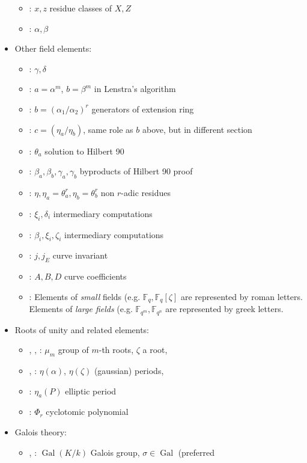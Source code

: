 \documentclass[12pt]{article}
\theoremstyle{plain}
\theoremstyle{definition}
\DeclareMathOperator{\gal}{Gal} %
\def\F{\ensuremath{\mathbb{F}}}
\newcounter{algorithm}
\begin{document}
\begin{itemize}
\begin{itemize}
  \item \kummer: $x,z$ residue classes of $X,Z$
  \item \rains: $\alpha,\beta$
  \end{itemize}
\item Other field elements:
  \begin{itemize}
  \item \poster: $\gamma, \delta$
  \item \poster: $a=\alpha^m$, $b=\beta^m$ in Lenstra's algorithm
  \item \kummer: $b=(\alpha_1/\alpha_2)^r$ generators of extension ring
  \item \kummer: $c=(\eta_a/\eta_b)$, same role as $b$ above, but in different section
  \item \kummer: $\theta_a$ solution to Hilbert 90
  \item \kummer: $\beta_a,\beta_b,\gamma_a,\gamma_b$ byproducts of Hilbert 90 proof
  \item \kummer: $\eta,\eta_a=\theta_a^r,\eta_b=\theta_b^r$ non $r$-adic residues
  \item \kummer: $\xi_i,\delta_i$ intermediary computations
  \item \kummer: $\beta_i,\xi_i,\zeta_i$ intermediary computations
  \item \rains: $j,j_E$ curve invariant
  \item \rains: $A,B,D$ curve coefficients
  \item \prop: Elements of \emph{small} fields (e.g. $\F_q,
    \F_q[\zeta]$ are represented by roman letters. Elements of
    \emph{large fields} (e.g. $\F_{q^m},\F_{q^n}$ are represented by
    greek letters.
  \end{itemize}
\item Roots of unity and related elements:
  \begin{itemize}
  \item \poster, \rains, \prop: $\mu_m$ group of $m$-th roots, $\zeta$ a root,
  \item \poster, \rains: $\eta(\alpha)$, $\eta(\zeta)$ (gaussian) periods,
  \item \rains: $\eta_a(P)$ elliptic period
  \item \kummer: $\Phi_r$ cyclotomic polynomial
  \end{itemize}
\item Galois theory:
  \begin{itemize}
  \item \poster, \prop: $\gal(K/k)$ Galois group, $\sigma\in\gal$ (preferred

\end{itemize}
\end{itemize}
\end{document}
